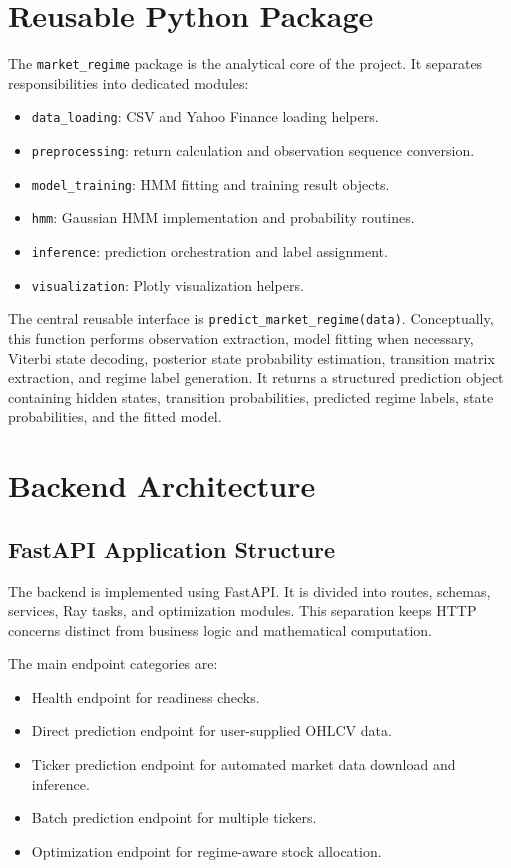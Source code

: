 \documentclass[conference]{IEEEtran}
\begin{document}
\section{Reusable Python Package}
The \texttt{market\_regime} package is the analytical core of the project. It separates responsibilities into dedicated modules:
\begin{itemize}
    \item \texttt{data\_loading}: CSV and Yahoo Finance loading helpers.
    \item \texttt{preprocessing}: return calculation and observation sequence conversion.
    \item \texttt{model\_training}: HMM fitting and training result objects.
    \item \texttt{hmm}: Gaussian HMM implementation and probability routines.
    \item \texttt{inference}: prediction orchestration and label assignment.
    \item \texttt{visualization}: Plotly visualization helpers.
\end{itemize}

The central reusable interface is \texttt{predict\_market\_regime(data)}. Conceptually, this function performs observation extraction, model fitting when necessary, Viterbi state decoding, posterior state probability estimation, transition matrix extraction, and regime label generation. It returns a structured prediction object containing hidden states, transition probabilities, predicted regime labels, state probabilities, and the fitted model.

\section{Backend Architecture}
\subsection{FastAPI Application Structure}
The backend is implemented using FastAPI. It is divided into routes, schemas, services, Ray tasks, and optimization modules. This separation keeps HTTP concerns distinct from business logic and mathematical computation.

The main endpoint categories are:
\begin{itemize}
    \item Health endpoint for readiness checks.
    \item Direct prediction endpoint for user-supplied OHLCV data.
    \item Ticker prediction endpoint for automated market data download and inference.
    \item Batch prediction endpoint for multiple tickers.
    \item Optimization endpoint for regime-aware stock allocation.
\end{itemize}
\end{document}
